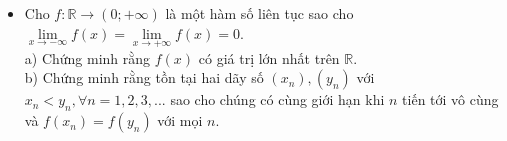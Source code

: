 \documentclass[11pt]{scrartcl}
\begin{document}
\begin{itemize}[label=, leftmargin=0em, itemsep=-0em]

    \item \begin{btvn}
        Cho $f:\mathbb{R}\to (0;+\infty)$ là một hàm số liên tục sao cho $\underset{x\to -\infty }{\mathop{\lim }}f(x)=\underset{x\to +\infty }{\mathop{\lim }}f(x)=0.$\\
a) Chứng minh rằng $f(x)$ có giá trị lớn nhất trên $\mathbb{R}.$\\
b) Chứng minh rằng tồn tại hai dãy số $({{x}_{n}}),({{y}_{n}})$ với ${{x}_{n}}<{{y}_{n}},\forall n=1,2,3,...$ sao cho chúng có cùng giới hạn khi $n$ tiến tới vô cùng và $f({{x}_{n}})=f({{y}_{n}})$ với mọi $n$.
    \end{btvn}

\end{itemize}
\end{document}
